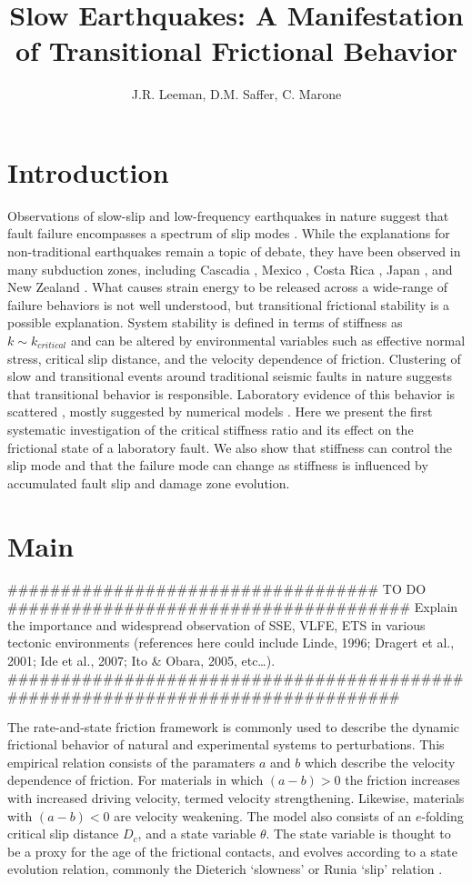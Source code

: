 \documentclass[11pt]{article}
\title{Slow Earthquakes: A Manifestation of Transitional Frictional Behavior}
\author{J.R. Leeman, D.M. Saffer, C. Marone}
\date{} %
\begin{document}
\maketitle

\section{Introduction}
Observations of slow-slip and low-frequency earthquakes in nature suggest that
fault failure encompasses a spectrum of slip modes \cite{Peng:2010, Ide:2007,
Beroza:2011}.  While the explanations for non-traditional earthquakes remain a
topic of debate, they have been observed in many subduction zones, including
Cascadia \cite{Miller:2002, Rogers:2003}, Mexico \cite{Kostoglodov:2003}, Costa
Rica \cite{Jiang:2012}, Japan \cite{Ito:2006}, and New Zealand
\cite{Wallace:2010}. What causes strain energy to be released across a
wide-range of failure behaviors is not well understood, but transitional
frictional stability is a  possible explanation. System stability is defined in
terms of stiffness as $k \sim k_{critical}$ \cite{Gu:1984} and can be altered by
environmental variables such as effective normal stress, critical slip distance,
and the velocity dependence of friction. Clustering of slow and transitional
events around traditional seismic faults in nature suggests that transitional
behavior is responsible. Laboratory evidence of this behavior is scattered
\cite{Kaproth:2013, Baumberger:1994, Leeman:2015}, mostly suggested by numerical
models \cite{Gu:1984}. Here we present the first systematic investigation of the
critical stiffness ratio and its effect on the frictional state of a laboratory
fault. We also show that stiffness can control the slip mode and that the
failure mode can change as stiffness is influenced by accumulated fault slip and
damage zone evolution.


\section{Main}

################################### TO DO ######################################
Explain the importance and widespread observation of SSE, VLFE, ETS in
various tectonic environments (references here could include Linde, 1996;
Dragert et al., 2001; Ide et al., 2007; Ito & Obara, 2005, etc…).
################################################################################


The rate-and-state friction framework is commonly used to describe the dynamic
frictional behavior of natural and experimental systems to perturbations. This
empirical relation consists of the paramaters $a$ and $b$ which describe the
velocity dependence of friction. For materials in which $(a-b)>0$ the friction
increases with increased driving velocity, termed velocity strengthening. Likewise,
materials with $(a-b)<0$ are velocity weakening. The model also consists of an
$e$-folding critical slip distance $D_c$, and a state variable $\theta$. The
state variable is thought to be a proxy for the age of the frictional contacts, and
evolves according to a state evolution relation, commonly the Dieterich `slowness'
or Runia `slip' relation \cite{Marone:1998,Dieterich:1979,Ruina:1983}.
\end{document}
